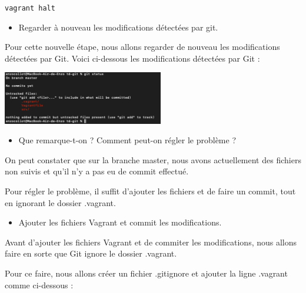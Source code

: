 \documentclass[12pt]{article}
\begin{document}
\texttt{vagrant halt}

\vspace{0.3cm}

\newpage

\begin{itemize}
  \item Regarder à nouveau les modifications détectées par git.
\end{itemize}

Pour cette nouvelle étape, nous allons regarder de nouveau les modifications détectées par Git. Voici ci-dessous les modifications détectées par Git :

\vspace{0.3cm}

\begin{center}
  \includegraphics[width=7cm]{Images-TD-Git/Image-TD-Git-1/git-status-2.png}
\end{center}

\vspace{0.3cm}

\begin{itemize}
  \item Que remarque-t-on ? Comment peut-on régler le problème ?
\end{itemize}

On peut constater que sur la branche master, nous avons actuellement des fichiers non suivis et qu'il n'y a pas eu de commit effectué. \newline

Pour régler le problème, il suffit d'ajouter les fichiers et de faire un commit, tout en ignorant le dossier .vagrant.

\vspace{0.3cm}

\begin{itemize}
  \item Ajouter les fichiers Vagrant et commit les modifications.
\end{itemize}

Avant d'ajouter les fichiers Vagrant et de commiter les modifications, nous allons faire en sorte que Git ignore le dossier .vagrant. \newline

Pour ce faire, nous allons créer un fichier .gitignore et ajouter la ligne .vagrant comme ci-dessous :
\end{document}

